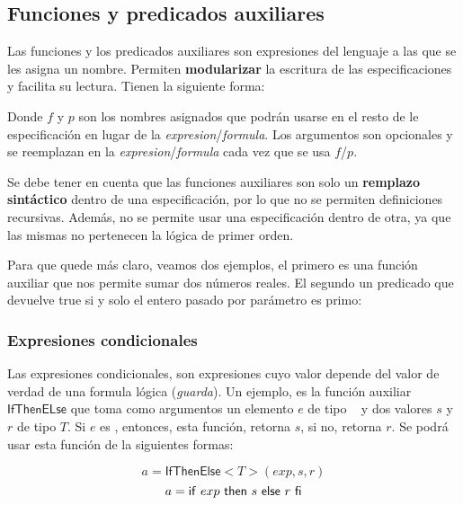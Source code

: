 \subsection{Funciones y predicados auxiliares}
Las funciones y los predicados auxiliares son expresiones del lenguaje a las que se les asigna un nombre. Permiten \textbf{modularizar} la  escritura de las especificaciones y facilita su lectura. Tienen la siguiente forma:

\begin{center}
	
\end{center}

Donde $f$ y $p$ son los nombres asignados que podrán usarse en el resto de le especificación en lugar de la \textit{expresion}/\textit{formula}. Los argumentos son opcionales y se reemplazan en la \textit{expresion}/\textit{formula} cada vez que se usa $f$/$p$.

Se debe tener en cuenta que las funciones auxiliares son solo un \textbf{remplazo sintáctico} dentro de una especificación, por lo que no se permiten definiciones recursivas. Además, no se permite usar una especificación dentro de otra, ya que las mismas no pertenecen  la lógica de primer orden.

Para que quede más claro, veamos dos ejemplos, el primero es una función auxiliar que nos permite sumar dos números reales. El segundo un predicado que devuelve true si y solo el entero pasado por parámetro es primo:
\begin{center}

\end{center}

\subsubsection{Expresiones condicionales}
Las expresiones condicionales, son expresiones cuyo valor depende del valor de verdad de una formula lógica (\textit{guarda}). 
Un ejemplo, es la función auxiliar $\mathsf{IfThenELse}$ que toma como argumentos un elemento $e$ de tipo \bool~ y dos valores $s$ y $r$ de tipo $T$. Si $e$ es \True, entonces, esta función, retorna $s$, si no, retorna $r$. Se podrá usar esta función de la siguientes formas:

$$a = \mathsf{IfThenElse}<T>(exp, s, r)$$
$$a = \mathsf{if}\ exp\ \mathsf{then}\ s\ \mathsf{else}\ r\ \mathsf{fi}$$

